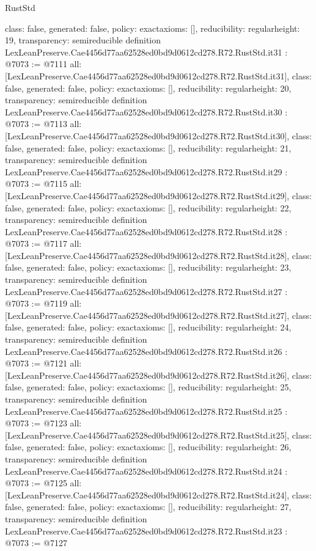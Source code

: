 \begin{lexlean}{RustStd}
\begin{coremodule}
{  class: false,
  generated: false,
  policy: exact{axioms: []},
  reducibility: regular{height: 19},
  transparency: semireducible
}
definition LexLeanPreserve.Cae4456d77aa62528ed0bd9d0612cd278.R72.RustStd.it31 : @7073 := @7111 {
  all: [LexLeanPreserve.Cae4456d77aa62528ed0bd9d0612cd278.R72.RustStd.it31],
  class: false,
  generated: false,
  policy: exact{axioms: []},
  reducibility: regular{height: 20},
  transparency: semireducible
}
definition LexLeanPreserve.Cae4456d77aa62528ed0bd9d0612cd278.R72.RustStd.it30 : @7073 := @7113 {
  all: [LexLeanPreserve.Cae4456d77aa62528ed0bd9d0612cd278.R72.RustStd.it30],
  class: false,
  generated: false,
  policy: exact{axioms: []},
  reducibility: regular{height: 21},
  transparency: semireducible
}
definition LexLeanPreserve.Cae4456d77aa62528ed0bd9d0612cd278.R72.RustStd.it29 : @7073 := @7115 {
  all: [LexLeanPreserve.Cae4456d77aa62528ed0bd9d0612cd278.R72.RustStd.it29],
  class: false,
  generated: false,
  policy: exact{axioms: []},
  reducibility: regular{height: 22},
  transparency: semireducible
}
definition LexLeanPreserve.Cae4456d77aa62528ed0bd9d0612cd278.R72.RustStd.it28 : @7073 := @7117 {
  all: [LexLeanPreserve.Cae4456d77aa62528ed0bd9d0612cd278.R72.RustStd.it28],
  class: false,
  generated: false,
  policy: exact{axioms: []},
  reducibility: regular{height: 23},
  transparency: semireducible
}
definition LexLeanPreserve.Cae4456d77aa62528ed0bd9d0612cd278.R72.RustStd.it27 : @7073 := @7119 {
  all: [LexLeanPreserve.Cae4456d77aa62528ed0bd9d0612cd278.R72.RustStd.it27],
  class: false,
  generated: false,
  policy: exact{axioms: []},
  reducibility: regular{height: 24},
  transparency: semireducible
}
definition LexLeanPreserve.Cae4456d77aa62528ed0bd9d0612cd278.R72.RustStd.it26 : @7073 := @7121 {
  all: [LexLeanPreserve.Cae4456d77aa62528ed0bd9d0612cd278.R72.RustStd.it26],
  class: false,
  generated: false,
  policy: exact{axioms: []},
  reducibility: regular{height: 25},
  transparency: semireducible
}
definition LexLeanPreserve.Cae4456d77aa62528ed0bd9d0612cd278.R72.RustStd.it25 : @7073 := @7123 {
  all: [LexLeanPreserve.Cae4456d77aa62528ed0bd9d0612cd278.R72.RustStd.it25],
  class: false,
  generated: false,
  policy: exact{axioms: []},
  reducibility: regular{height: 26},
  transparency: semireducible
}
definition LexLeanPreserve.Cae4456d77aa62528ed0bd9d0612cd278.R72.RustStd.it24 : @7073 := @7125 {
  all: [LexLeanPreserve.Cae4456d77aa62528ed0bd9d0612cd278.R72.RustStd.it24],
  class: false,
  generated: false,
  policy: exact{axioms: []},
  reducibility: regular{height: 27},
  transparency: semireducible
}
definition LexLeanPreserve.Cae4456d77aa62528ed0bd9d0612cd278.R72.RustStd.it23 : @7073 := @7127 {
}
\end{coremodule}
\end{lexlean}
